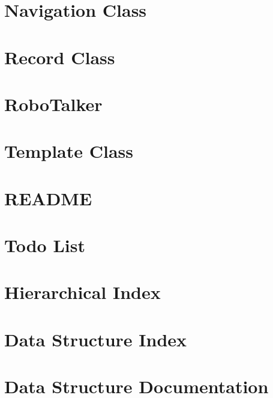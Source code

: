 \documentclass{book}
\begin{document}
\chapter{Navigation Class}
\label{nav1}
\hypertarget{nav1}{}

\chapter{Record Class}
\label{record1}
\hypertarget{record1}{}

\chapter{Robo\-Talker}
\label{robo1}
\hypertarget{robo1}{}

\chapter{Template Class}
\label{template1}
\hypertarget{template1}{}

\chapter{R\-E\-A\-D\-M\-E}
\label{md_README}
\hypertarget{md_README}{}

\chapter{Todo List}
\label{todo}
\hypertarget{todo}{}

\chapter{Hierarchical Index}

\chapter{Data Structure Index}

\chapter{Data Structure Documentation}























\printindex
\end{document}
